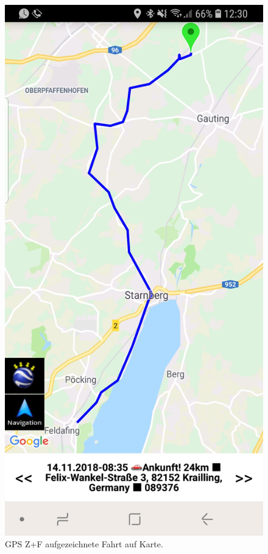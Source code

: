\documentclass[a4paper]{article}
\begin{document}
\begin{figure}[H]
\begin{minipage}[b]{.4\linewidth}
        \includegraphics[scale=0.14]{img/gps4}
        \caption{\label{img:img/gps4}GPS Z+F aufgezeichnete Fahrt auf Karte.}
    \end{minipage}
\end{figure}
\end{document}
